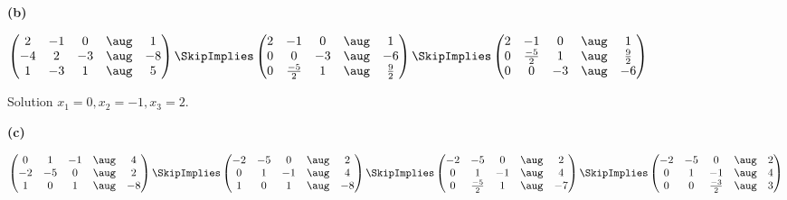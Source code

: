 \documentclass[oneside,12pt]{amsart}
\begin{document}
\bigskip


\textbf{(b)}

\bigskip

$
\begin{pmatrix}
2 & -1 & 0  & \aug & 1 \\
-4 & 2 & -3 & \aug & -8 \\
1 & -3 & 1  & \aug & 5 \\
\end{pmatrix}
\SkipImplies
\begin{pmatrix}
2 & -1 & 0 &            \aug &   1 \\
0 & 0 & -3 &            \aug &  -6 \\
0 & \frac{-5}{2} & 1 &  \aug &  \frac{9}{2} \\
\end{pmatrix}
\SkipImplies
\begin{pmatrix}
2 & -1 & 0 &            \aug &   1 \\
0 & \frac{-5}{2} & 1 &  \aug &  \frac{9}{2} \\
0 & 0 & -3 &            \aug &  -6 \\
\end{pmatrix}
$

\bigskip

Solution $x_1=0, x_2=-1, x_3=2$.


\textbf{(c)}

\bigskip

$
\begin{pmatrix}
0 & 1 & -1 &  \aug &  4 \\
-2 & -5 & 0 & \aug &  2 \\
1 & 0 & 1 &   \aug & -8 \\
\end{pmatrix}
\SkipImplies
\begin{pmatrix}
-2 & -5 & 0 & \aug &  2 \\
 0 & 1 & -1 & \aug &  4 \\
1 & 0 & 1 &   \aug & -8 \\
\end{pmatrix}
\SkipImplies
\begin{pmatrix}
-2 & -5 & 0 &           \aug &  2 \\
0 & 1 & -1 &            \aug &  4 \\
0 & \frac{-5}{2} & 1 &  \aug &  -7
\end{pmatrix}
\SkipImplies
\begin{pmatrix}
-2 & -5 & 0 &            \aug &   2 \\
0 & 1 & -1 &             \aug &  4 \\
0 & 0 & \frac{-3}{2} &   \aug &  3
\end{pmatrix}
$
\end{document}
